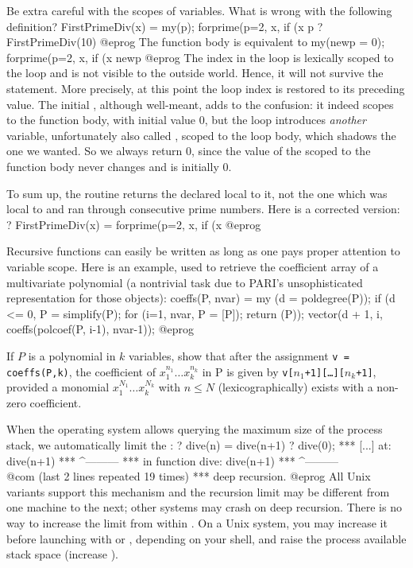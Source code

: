 \label{se:bewarescope}
Be extra careful with the scopes of variables. What is wrong with the
following definition?
\bprog
FirstPrimeDiv(x) =
{ my(p);
  forprime(p=2, x, if (x%
  p
}
? FirstPrimeDiv(10)
@eprog\noindent {} The function body is equivalent to
\bprog
{ my(newp = 0);
  forprime(p=2, x, if (x%
  newp
}
@eprog\noindent
{} The index  in the 
loop is lexically scoped to the loop and is not visible to the outside world.
Hence, it will not survive the  statement. More precisely, at this
point the loop index is restored to its preceding value. The initial
, although well-meant, adds to the confusion: it indeed scopes
 to the function body, with initial value $0$, but the 
loop introduces \emph{another} variable, unfortunately also called ,
scoped to the loop body, which shadows the one we wanted. So we always return
$0$, since the value of the  scoped to the function body never changes
and is initially $0$.

To sum up, the routine returns the  declared local to
it, not the one which was local to  and ran through consecutive
prime numbers. Here is a corrected version:
\bprog
? FirstPrimeDiv(x) = forprime(p=2, x, if (x%
@eprog

 Recursive functions can easily
be written as long as one pays proper attention to variable scope. Here is an
example, used to retrieve the coefficient array of a multivariate polynomial
(a nontrivial task due to PARI's unsophisticated representation for those
objects): 
\bprog
coeffs(P, nvar) =
{ my (d = poldegree(P));
  if (d <= 0,
    P = simplify(P); for (i=1, nvar, P = [P]);
    return (P));
  vector(d + 1, i, coeffs(polcoef(P, i-1), nvar-1));
}
@eprog

\noindent If $P$ is a polynomial in $k$ variables, show that after the
assignment {\tt v = coeffs(P,k)}, the coefficient of $x_1^{n_1}\dots
x_k^{n_k}$ in P is given by {\tt v[$n_1$+1][\dots][$n_k$+1]}, provided
a monomial $x_1^{N_1}\dots x_k^{N_k}$ with $n \leq N$ (lexicographically)
exists with a non-zero coefficient.

When the operating system allows querying the maximum size of the process
stack, we automatically limit the : 
\bprog
? dive(n) = dive(n+1)
? dive(0);
  ***   [...] at: dive(n+1)
  ***             ^---------
  ***   in function dive: dive(n+1)
  ***                     ^---------
  \\@com (last 2 lines repeated 19 times)
  ***   deep recursion.
@eprog\noindent
All Unix variants support this mechanism and the recursion limit
may be different from one machine to the next; other systems may crash on
deep recursion. There is no way to increase the limit from within .
On a Unix system, you may increase it before launching  with
 or , depending on your shell, and raise the process
available stack space (increase ).

